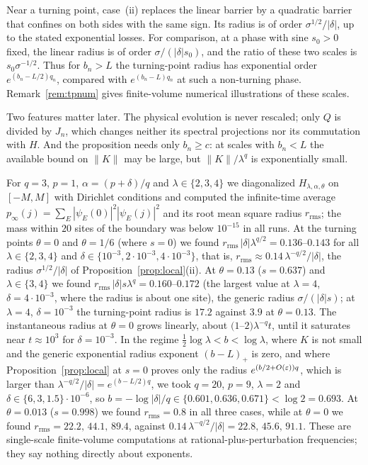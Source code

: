 Near a turning point, case~(ii) replaces the linear barrier by a quadratic barrier that confines on both sides with the same sign. Its radius is of order $\sigma^{1/2}/|\delta|$, up to the stated exponential losses. For comparison, at a phase with sine $s_0>0$ fixed, the linear radius is of order $\sigma/(|\delta|s_0)$, and the ratio of these two scales is $s_0\sigma^{-1/2}$. Thus for $b_n>L$ the turning-point radius has exponential order $e^{(b_n-L/2)q_n}$, compared with $e^{(b_n-L)q_n}$ at such a non-turning phase. Remark~\ref{rem:tpnum} gives finite-volume numerical illustrations of these scales.

Two features matter later. The physical evolution is never rescaled; only $Q$ is divided by $J_n$, which changes neither its spectral projections nor its commutation with $H$. And the proposition needs only $b_n\ge c$: at scales with $b_n<L$ the available bound on $\|K\|$ may be large, but $\|K\|/\lambda^q$ is exponentially small.

\begin{remark}\label{rem:tpnum}
For $q=3$, $p=1$, $\alpha=(p+\delta)/q$ and $\lambda\in\{2,3,4\}$ we diagonalized $H_{\lambda,\alpha,\theta}$ on $[-M,M]$ with Dirichlet conditions and computed the infinite-time average $p_\infty(j)=\sum_E|\psi_E(0)|^2|\psi_E(j)|^2$ and its root mean square radius $r_{\mathrm{rms}}$; the mass within $20$ sites of the boundary was below $10^{-15}$ in all runs. At the turning points $\theta=0$ and $\theta=1/6$ (where $s=0$) we found $r_{\mathrm{rms}}\,|\delta|\lambda^{q/2}=0.136$--$0.143$ for all $\lambda\in\{2,3,4\}$ and $\delta\in\{10^{-3},2\cdot10^{-3},4\cdot10^{-3}\}$, that is, $r_{\mathrm{rms}}\approx0.14\,\lambda^{-q/2}/|\delta|$, the radius $\sigma^{1/2}/|\delta|$ of Proposition~\ref{prop:local}(ii). At $\theta=0.13$ ($s=0.637$) and $\lambda\in\{3,4\}$ we found $r_{\mathrm{rms}}\,|\delta|s\lambda^q=0.160$--$0.172$ (the largest value at $\lambda=4$, $\delta=4\cdot10^{-3}$, where the radius is about one site), the generic radius $\sigma/(|\delta|s)$; at $\lambda=4$, $\delta=10^{-3}$ the turning-point radius is $17.2$ against $3.9$ at $\theta=0.13$. The instantaneous radius at $\theta=0$ grows linearly, about $(1$--$2)\lambda^{-q}t$, until it saturates near $t\approx10^3$ for $\delta=10^{-3}$. In the regime $\frac12\log\lambda<b<\log\lambda$, where $K$ is not small and the generic exponential radius exponent $(b-L)_+$ is zero, and where Proposition~\ref{prop:local} at $s=0$ proves only the radius $e^{(b/2+O(\varepsilon))q}$, which is larger than $\lambda^{-q/2}/|\delta|=e^{(b-L/2)q}$, we took $q=20$, $p=9$, $\lambda=2$ and $\delta\in\{6,3,1.5\}\cdot10^{-6}$, so $b=-\log|\delta|/q\in\{0.601,0.636,0.671\}<\log2=0.693$. At $\theta=0.013$ ($s=0.998$) we found $r_{\mathrm{rms}}=0.8$ in all three cases, while at $\theta=0$ we found $r_{\mathrm{rms}}=22.2,\,44.1,\,89.4$, against $0.14\,\lambda^{-q/2}/|\delta|=22.8,\,45.6,\,91.1$. These are single-scale finite-volume computations at rational-plus-perturbation frequencies; they say nothing directly about exponents.
\end{remark}
